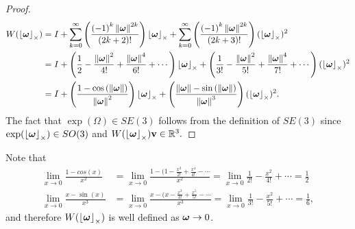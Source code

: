 \begin{proof}
\begin{align*}
W(\left\lfloor\boldsymbol{\omega}\right\rfloor_{\times}) 
 & =I+\sum_{k=0}^{\infty}\left(\frac{\left(-1\right)^{k}\left\|\boldsymbol{\omega}\right\|^{2k}}{\left(2k+2\right)!}\right)\left\lfloor\boldsymbol{\omega}\right\rfloor_{\times}+\sum_{k=0}^{\infty}\left(\frac{\left(-1\right)^{k}\left\|\boldsymbol{\omega}\right\|^{2k}}{\left(2k+3\right)!}\right)(\left\lfloor\boldsymbol{\omega}\right\rfloor_{\times})^{2}\\
 & =I+\left(\frac{1}{2}-\frac{\left\|\boldsymbol{\omega}\right\|^{2}}{4!}+\frac{\left\|\boldsymbol{\omega}\right\|^{4}}{6!}+\cdots\right)\left\lfloor\boldsymbol{\omega}\right\rfloor_{\times}+\left(\frac{1}{3!}-\frac{\left\|\boldsymbol{\omega}\right\|^{2}}{5!}+\frac{\left\|\boldsymbol{\omega}\right\|^{4}}{7!}+\cdots\right)(\left\lfloor\boldsymbol{\omega}\right\rfloor_{\times})^{2}\\
 & =I+\left(\frac{1-\cos\left(\left\|\boldsymbol{\omega}\right\|\right)}{\left\|\boldsymbol{\omega}\right\|^{2}}\right)\left\lfloor\boldsymbol{\omega}\right\rfloor_{\times}+\left(\frac{\left\|\boldsymbol{\omega}\right\|-\sin\left(\left\|\boldsymbol{\omega}\right\|\right)}{\left\|\boldsymbol{\omega}\right\|^{3}}\right)(\left\lfloor\boldsymbol{\omega}\right\rfloor_{\times})^{2}.
\end{align*}
The fact that $\exp(\Omega)\in SE(3)$ follows from the definition of $SE(3)$ since $\exp(\left\lfloor\boldsymbol{\omega}\right\rfloor_{\times})\in SO(3)$ and $W(\left\lfloor\boldsymbol{\omega}\right\rfloor_{\times})\mathbf{v}\in\mathbb{R}^3.$
\end{proof}
Note that 
\begin{align*}
	\lim_{x\to 0}\frac{1-cos(x)}{x^2} &= \lim_{x\to 0}\frac{ 1-(1-\frac{x^2}{2!}+\frac{x^4}{4!}-\cdots}{x^2} 
        							  = \lim_{x\to 0} \frac{1}{2!}-\frac{x^2}{4!}+\cdots = \frac{1}{2} \\
   	\lim_{x\to 0}\frac{x-\sin(x)}{x^3} &= \lim_{x\to 0}\frac{x-(x-\frac{x^3}{3!}+\frac{x^5}{5!}-\cdots}{x^3}
   	                                    = \lim_{x\to 0} \frac{1}{3!} - \frac{x^2}{5!} + \cdots = \frac{1}{6},
\end{align*}
and therefore $W(\left\lfloor\boldsymbol{\omega}\right\rfloor_{\times})$ is well defined as $\boldsymbol{\omega}\to 0$.

